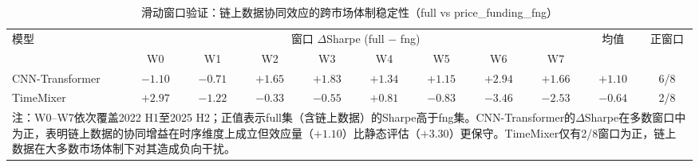 \begin{table}[H]
\centering
\caption{滑动窗口验证：链上数据协同效应的跨市场体制稳定性（full vs price\_funding\_fng）}
\label{tab:sw_delta_sharpe}
\small
\setlength{\tabcolsep}{2.5pt}
\begin{tabular}{lcccccccccc}
\toprule
\multirow{2}{*}{模型} & \multicolumn{8}{c}{窗口 $\Delta$Sharpe (full $-$ fng)} & \multirow{2}{*}{均值} & \multirow{2}{*}{正窗口} \\
\cmidrule(lr){2-9}
& W0 & W1 & W2 & W3 & W4 & W5 & W6 & W7 \\
\midrule
CNN-Transformer & $-1.10$ & $-0.71$ & $+1.65$ & $+1.83$ & $+1.34$ & $+1.15$ & $+2.94$ & $+1.66$ & $+1.10$ & 6/8 \\
TimeMixer & $+2.97$ & $-1.22$ & $-0.33$ & $-0.55$ & $+0.81$ & $-0.83$ & $-3.46$ & $-2.53$ & $-0.64$ & 2/8 \\
\bottomrule
\multicolumn{11}{p{\textwidth}}{\footnotesize 注：W0--W7依次覆盖2022 H1至2025 H2；正值表示full集（含链上数据）的Sharpe高于fng集。CNN-Transformer的$\Delta$Sharpe在多数窗口中为正，表明链上数据的协同增益在时序维度上成立但效应量（$+1.10$）比静态评估（$+3.30$）更保守。TimeMixer仅有2/8窗口为正，链上数据在大多数市场体制下对其造成负向干扰。}\\
\end{tabular}
\end{table}
